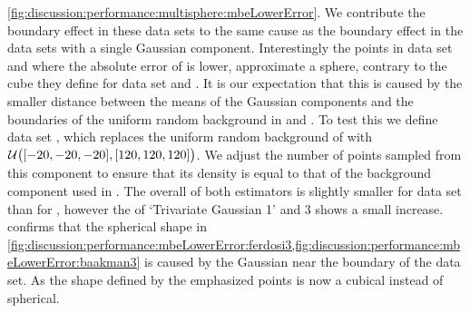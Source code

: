 		\cref{fig:discussion:performance:multisphere:mbeLowerError}. We contribute the boundary effect in these data sets to the same cause as the boundary effect in the data sets with a single Gaussian component. Interestingly the points in data set \ferdosiThree and \baakmanThree where the absolute error of \mbe is lower, approximate a sphere, contrary to the cube they define for data set \ferdosiTwo and \baakmanTwo. It is our expectation that this is caused by the smaller distance between the means of the Gaussian components and the boundaries of the uniform random background in \ferdosiThree and \baakmanThree.
			To test this we define data set \ferdosiThreeNoise, which replaces the uniform random background of \ferdosiThree with $\mathcal{U}\big([-20, -20, -20], [120, 120, 120]\big)$. We adjust the number of points sampled from this component to ensure that its density is equal to that of the background component used in \ferdosiThree.
			The overall \mse of both estimators is slightly smaller for data set \ferdosiThreeNoise than for \ferdosiThree, however the \mse of `Trivariate Gaussian 1' and 3 shows a small increase.
			 confirms that the spherical shape in \cref{fig:discussion:performance:mbeLowerError:ferdosi3,fig:discussion:performance:mbeLowerError:baakman3} is caused by the Gaussian near the boundary of the data set. As the shape defined by the emphasized points is now a cubical instead of spherical.
